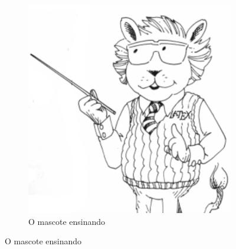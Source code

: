 \begin{figure}[ht]
\begin{subfigure}[t]{.4\textwidth}
        \includegraphics[width=\textwidth]{figuras/latex_lion.pdf}
        \caption{O mascote ensinando}\label{fig:mascote2}
    \end{subfigure}
\end{figure}
